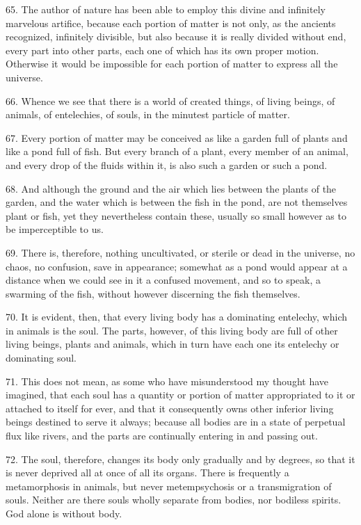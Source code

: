 65. The author of nature has been able to employ this divine and
infinitely marvelous artifice, because each portion of matter is not
only, as the ancients  recognized, infinitely divisible, but
also because it is really divided without end, every part into other
parts, each one of which has its own proper motion. Otherwise it would
be impossible for each portion of matter to express all the universe.

66. Whence we see that there is a world of created things, of living
beings, of animals, of entelechies, of souls, in the minutest particle
of matter.

67. Every portion of matter may be conceived as like a garden full of
plants and like a pond full of fish. But every branch of a plant,
every member of an animal, and every drop of the fluids within it, is
also such a garden or such a pond.

68. And although the ground and the air which lies between the plants
of the garden, and the water which is between the fish in the pond,
are not themselves plant or fish, yet they nevertheless contain these,
usually so small however as to be imperceptible to us.

69. There is, therefore, nothing uncultivated, or sterile or dead in
the universe, no chaos, no confusion, save in appearance; somewhat as
a pond would appear at a distance when we could see in it a confused
movement, and so to speak, a swarming of the fish, without however
discerning the fish themselves.

70. It is evident, then, that every living body has a dominating
entelechy, which in animals is the soul. The parts, however, of this
living body are full of other living beings, plants and animals, which
in turn have each one its entelechy or dominating soul.

71. This does not mean, as some who have misunderstood my thought have
imagined, that each soul has a quantity or portion of matter
appropriated to it or attached to itself for ever, and that it
consequently  owns other inferior living beings destined to
serve it always; because all bodies are in a state of perpetual flux
like rivers, and the parts are continually entering in and passing
out.

72. The soul, therefore, changes its body only gradually and by
degrees, so that it is never deprived all at once of all its organs.
There is frequently a metamorphosis in animals, but never
metempsychosis or a transmigration of souls. Neither are there souls
wholly separate from bodies, nor bodiless spirits. God alone is
without body.

